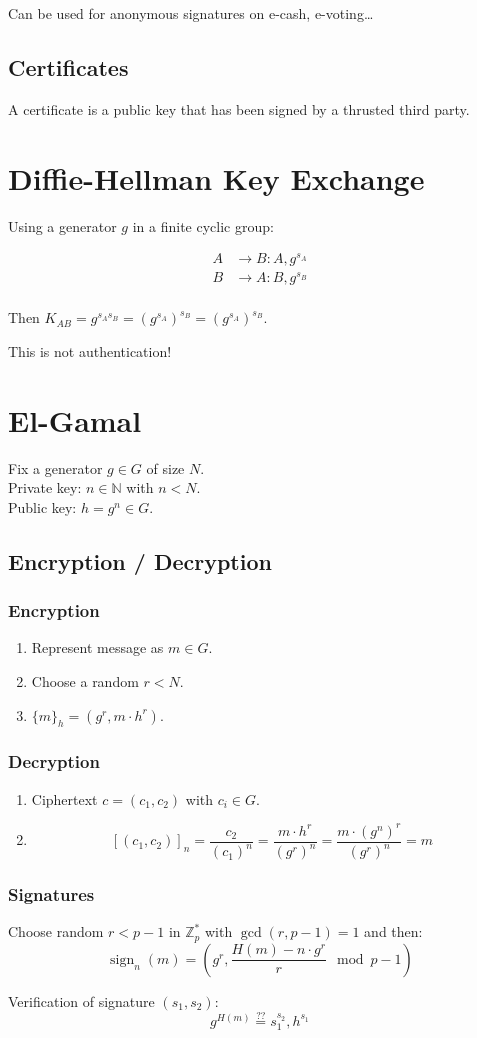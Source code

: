 \documentclass{article}
\newcommand{\Z}{\mathbb{Z}}
\begin{document}
Can be used for anonymous signatures on e-cash, e-voting\dots

\subsection{Certificates}
A certificate is a public key that has been signed by a thrusted third party.

\section{Diffie-Hellman Key Exchange}

Using a generator $g$ in a finite cyclic group:

\begin{align*}
  A &\longrightarrow B: A, g^{s_A} \\
  B &\longrightarrow A: B, g^{s_B} \\
\end{align*}

Then $K_{AB} = g^{s_A s_B} = (g^{s_A})^{s_B} = (g^{s_A})^{s_B}$.

This is not authentication!

\section{El-Gamal}
Fix a generator $g \in G$ of size $N$. \\
Private key: $n \in \mathbb{N}$ with $n < N$. \\
Public key: $h = g^n \in G$.

\subsection{Encryption / Decryption}
\subsubsection{Encryption}

\begin{enumerate}
  \item Represent message as $m \in G$.
  \item Choose a random $r < N$.
  \item $\{m\}_h = (g^r, m \cdot h^r)$.
\end{enumerate}

\subsubsection{Decryption}
\begin{enumerate}
  \item Ciphertext $c = (c_1,c_2)$ with $c_i \in G$.
  \item \[
      [(c_1, c_2)]_n = \frac{c_2}{(c_1)^n} = \frac{m \cdot h^r}{(g^r)^n} = \frac{m \cdot (g^n)^r}{(g^r)^n} = m
    \]
\end{enumerate}


\subsubsection{Signatures}

Choose random $r < p-1$ in $\Z^*_p$ with $\gcd(r,p-1) = 1$ and then:
\[
  \operatorname{sign}_n(m) = \left( g^r, \frac{H(m) - n \cdot g^r}{r} \mod p-1 \right)
\]

Verification of signature $(s_1, s_2)$:
\[
  g^{H(m)} \overset{??}{=} s_1^{s_2}, h^{s_1}
\]
\end{document}
